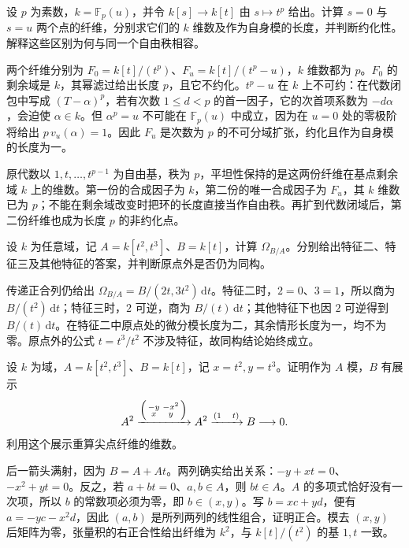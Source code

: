 \begin{optionalexercise}\label{b3:ex:23-frobenius-fiber-length}
	设 \(p\) 为素数，\(k=\mathbb F_p(u)\)，并令 \(k[s]\to k[t]\) 由 \(s\mapsto t^p\) 给出。计算 \(s=0\) 与 \(s=u\) 两个点的纤维，分别求它们的 \(k\) 维数及作为自身模的长度，并判断约化性。解释这些区别为何与同一个自由秩相容。
\end{optionalexercise}
\begin{solution}
	两个纤维分别为 \(F_0=k[t]/(t^p)\)、\(F_u=k[t]/(t^p-u)\)，\(k\) 维数都为 \(p\)。\(F_0\) 的剩余域是 \(k\)，其幂滤过给出长度 \(p\)，且它不约化。\(t^p-u\) 在 \(k\) 上不可约：在代数闭包中写成 \((T-\alpha)^p\)，若有次数 \(1\le d<p\) 的首一因子，它的次首项系数为 \(-d\alpha\)，会迫使 \(\alpha\in k\)。但 \(\alpha^p=u\) 不可能在 \(\mathbb F_p(u)\) 中成立，因为在 \(u=0\) 处的零极阶将给出 \(p\,v_u(\alpha)=1\)。因此 \(F_u\) 是次数为 \(p\) 的不可分域扩张，约化且作为自身模的长度为一。

	原代数以 \(1,t,\ldots,t^{p-1}\) 为自由基，秩为 \(p\)，平坦性保持的是这两份纤维在基点剩余域 \(k\) 上的维数。第一份的合成因子为 \(k\)，第二份的唯一合成因子为 \(F_u\)，其 \(k\) 维数已为 \(p\)；不能在剩余域改变时把环的长度直接当作自由秩。再扩到代数闭域后，第二份纤维也成为长度 \(p\) 的非约化点。
\end{solution}

\begin{optionalexercise}\label{b3:ex:23-cusp-other-characteristics}
	设 \(k\) 为任意域，记 \(A=k[t^2,t^3]\)、\(B=k[t]\)，计算 \(\Omega_{B/A}\)。分别给出特征二、特征三及其他特征的答案，并判断原点外是否仍为同构。
\end{optionalexercise}
\begin{solution}
	传递正合列仍给出 \(\Omega_{B/A}=B/(2t,3t^2)\,\mathrm{d}t\)。特征二时，\(2=0\)、\(3=1\)，所以商为 \(B/(t^2)\,\mathrm{d}t\)；特征三时，\(2\) 可逆，商为 \(B/(t)\,\mathrm{d}t\)；其他特征下也因 \(2\) 可逆得到 \(B/(t)\,\mathrm{d}t\)。在特征二中原点处的微分模长度为二，其余情形长度为一，均不为零。原点外的公式 \(t=t^3/t^2\) 不涉及特征，故同构结论始终成立。
\end{solution}

\begin{optionalexercise}\label{b3:ex:23-cusp-module-presentation}
	设 \(k\) 为域，\(A=k[t^2,t^3]\)、\(B=k[t]\)，记 \(x=t^2,y=t^3\)。证明作为 \(A\) 模，\(B\) 有展示
	\[
		A^2\xrightarrow{\begin{psmallmatrix}-y&-x^2\\x&y\end{psmallmatrix}}
		A^2\xrightarrow{(1\quad t)}B\longrightarrow0.
	\]
	利用这个展示重算尖点纤维的维数。
\end{optionalexercise}
\begin{solution}
	后一箭头满射，因为 \(B=A+At\)。两列确实给出关系：\(-y+xt=0\)、\(-x^2+yt=0\)。反之，若 \(a+bt=0\)、\(a,b\in A\)，则 \(bt\in A\)。\(A\) 的多项式恰好没有一次项，所以 \(b\) 的常数项必须为零，即 \(b\in(x,y)\)。写 \(b=xc+yd\)，便有 \(a=-yc-x^2d\)，因此 \((a,b)\) 是所列两列的线性组合，证明正合。模去 \((x,y)\) 后矩阵为零，张量积的右正合性给出纤维为 \(k^2\)，与 \(k[t]/(t^2)\) 的基 \(1,t\) 一致。
\end{solution}

